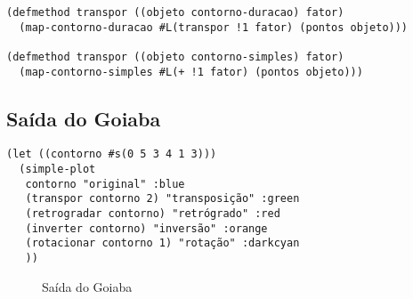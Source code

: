 \documentclass[brazil,12pt,plain]{article}
\begin{document}
\begin{verbatim}
(defmethod transpor ((objeto contorno-duracao) fator)
  (map-contorno-duracao #L(transpor !1 fator) (pontos objeto)))

(defmethod transpor ((objeto contorno-simples) fator)
  (map-contorno-simples #L(+ !1 fator) (pontos objeto)))
\end{verbatim}

\subsection{Saída do Goiaba}
\label{sec:saida-do-goiaba}

\begin{verbatim}
(let ((contorno #s(0 5 3 4 1 3)))
  (simple-plot
   contorno "original" :blue
   (transpor contorno 2) "transposição" :green
   (retrogradar contorno) "retrógrado" :red
   (inverter contorno) "inversão" :orange
   (rotacionar contorno 1) "rotação" :darkcyan
   ))
\end{verbatim}

  \begin{figure}[!h]
    \centering

    \caption{Saída do Goiaba}
  \end{figure}
\end{document}
